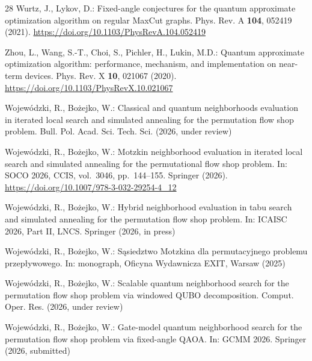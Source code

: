 \documentclass[runningheads]{llncs}
\begin{document}
\begin{thebibliography}{28}
Wurtz, J., Lykov, D.: Fixed-angle conjectures for the quantum approximate
optimization algorithm on regular MaxCut graphs. Phys. Rev. A
\textbf{104}, 052419 (2021).
\url{https://doi.org/10.1103/PhysRevA.104.052419}

Zhou, L., Wang, S.-T., Choi, S., Pichler, H., Lukin, M.D.: Quantum
approximate optimization algorithm: performance, mechanism, and
implementation on near-term devices. Phys. Rev. X \textbf{10}, 021067
(2020). \url{https://doi.org/10.1103/PhysRevX.10.021067}


Wojew\'{o}dzki, R., Bo\.{z}ejko, W.: Classical and quantum neighborhoods
evaluation in iterated local search and simulated annealing for the
permutation flow shop problem. Bull. Pol. Acad. Sci. Tech. Sci.
(2026, under review)


Wojew\'{o}dzki, R., Bo\.{z}ejko, W.: Motzkin neighborhood evaluation in
iterated local search and simulated annealing for the permutational
flow shop problem. In: SOCO 2026, CCIS, vol.\ 3046, pp.\ 144--155.
Springer (2026). \url{https://doi.org/10.1007/978-3-032-29254-4_12}

Wojew\'{o}dzki, R., Bo\.{z}ejko, W.: Hybrid neighborhood evaluation in tabu
search and simulated annealing for the permutation flow shop problem. In: ICAISC 2026, Part II, LNCS. Springer (2026, in press)

Wojew\'{o}dzki, R., Bo\.{z}ejko, W.: S\k{a}siedztwo Motzkina dla
permutacyjnego problemu przep\l{}ywowego. In: monograph, Oficyna Wydawnicza
EXIT, Warsaw (2025)


Wojew\'{o}dzki, R., Bo\.{z}ejko, W.: Scalable quantum neighborhood search
for the permutation flow shop problem via windowed QUBO decomposition.
Comput. Oper. Res. (2026, under review)

Wojew\'{o}dzki, R., Bo\.{z}ejko, W.: Gate-model quantum neighborhood search
for the permutation flow shop problem via fixed-angle QAOA. In: GCMM 2026. Springer (2026, submitted)

\end{thebibliography}
\end{document}

